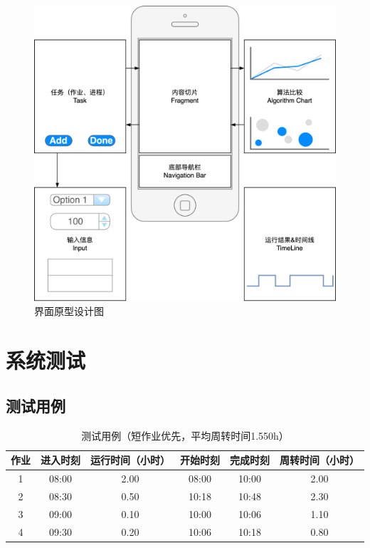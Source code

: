 \documentclass[12pt, a4paper, UTF8]{ctexart}
\begin{document}
\begin{figure}[htbp]
    \centering
    \includegraphics[scale=0.08]{i-prototype.png}
    \caption{界面原型设计图}
\end{figure}

\newpage
\section{系统测试}

\subsection{测试用例}
\begin{table}[htbp]
    \caption{测试用例（短作业优先，平均周转时间1.550h）}
    \centering
    \begin{tabular}{cccccc}
        \toprule
        作业 & 进入时刻 & 运行时间（小时） & 开始时刻 & 完成时刻 & 周转时间（小时） \\
        \midrule
        1    & 08:00    & 2.00             & 08:00    & 10:00    & 2.00             \\
        2    & 08:30    & 0.50             & 10:18    & 10:48    & 2.30             \\
        3    & 09:00    & 0.10             & 10:00    & 10:06    & 1.10             \\
        4    & 09:30    & 0.20             & 10:06    & 10:18    & 0.80             \\
        \bottomrule
    \end{tabular}
    \qquad
\end{table}
\end{document}
